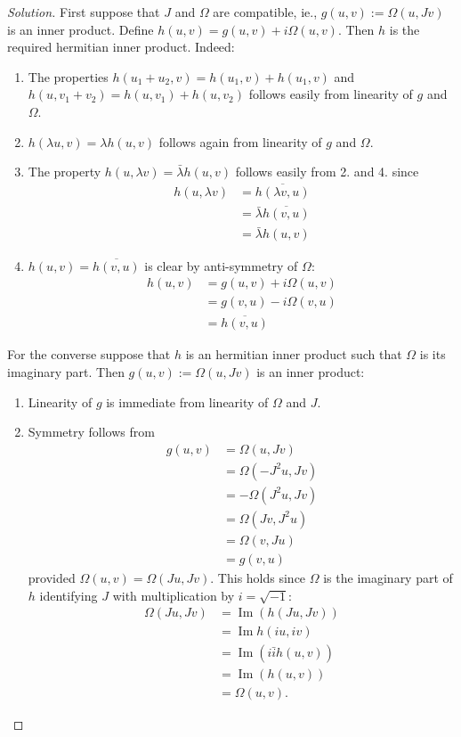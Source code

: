 \begin{proof}[Solution]\leavevmode
	First suppose that $J$ and $\Omega$ are compatible, ie., $g(u,v):=\Omega(u,Jv)$ is an inner product. Define $h(u,v)=g(u,v)+i\Omega(u,v)$. Then  $h$ is the required hermitian inner product. Indeed:

	\begin{enumerate}
		\item The properties $h(u_1+u_2,v)=h(u_1,v)+h(u_1,v)$ and  $h(u,v_1+v_2)=h(u,v_1)+h(u,v_2)$ follows easily from linearity of $g$ and $\Omega$.
		
		\item $h(\lambda u,v)=\lambda h(u,v)$ follows again from linearity of $g$ and $\Omega$.

		\item The property $h(u,\lambda v)=\bar{\lambda} h(u,v)$ follows easily from 2. and 4. since 
			\begin{align*}
				h(u,\lambda v)& =\overline{h(\lambda v, u)}\\
				& =\bar{\lambda} \overline{h(v,u)}\\
				& =\bar{\lambda} h(u,v)
			\end{align*}

		\item $h(u,v)=\overline{h(v,u)}$ is clear by anti-symmetry of $\Omega$:
			\begin{align*}
				h(u,v)& =g(u,v)+i\Omega(u,v)\\
				& =g(v,u)-i\Omega(v,u)\\
				& =\overline{h(v,u)}
			\end{align*}
	\end{enumerate}
	For the converse suppose that $h$ is an hermitian inner product such that $\Omega$ is its imaginary part. Then $g(u,v):=\Omega(u,Jv)$ is an inner product:
	\begin{enumerate}
		\item Linearity of $g$ is immediate from linearity of $\Omega$ and $J$.

		\item Symmetry follows from 
			 \begin{align*}
				g(u,v)&=\Omega(u,Jv)\\
				&=\Omega(-J^{2} u,Jv)\\
				& =-\Omega(J^{2} u,Jv)\\
				& =\Omega(Jv,J^{2} u)\\
				&=\Omega(v,Ju)\\
				&=g(v,u)
			\end{align*}
		provided $\Omega(u,v)=\Omega(Ju,Jv)$. This holds since $\Omega$ is the imaginary part of $h$ identifying $J$ with multiplication by $i=\sqrt{-1}$:
			\begin{align*}
				\Omega(Ju,Jv)&=\operatorname{Im}(h (Ju,Jv))\\
				& =\operatorname{Im}h(iu,iv)\\
				&=\operatorname{Im}(i\bar{i}h(u,v))\\
				&=\operatorname{Im}(h(u,v))\\
				&=\Omega(u,v).
			\end{align*}


\end{enumerate}
\end{proof}
